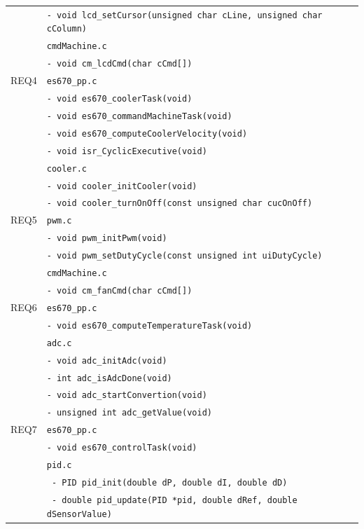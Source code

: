 \documentclass{article}
\begin{document}
\begin{table}[H]
\begin{tabular}{|c|l|}
						& \texttt{- void lcd\_setCursor(unsigned char cLine, unsigned char cColumn)}\\
						& \texttt{cmdMachine.c}\\ 
						& \texttt{- void cm\_lcdCmd(char cCmd[])}\\
   	    \hline REQ4    	& \texttt{es670\_pp.c}\\
       	           		& \texttt{- void es670\_coolerTask(void)}\\
     					& \texttt{- void es670\_commandMachineTask(void)}\\
						& \texttt{- void es670\_computeCoolerVelocity(void)}\\
						& \texttt{- void isr\_CyclicExecutive(void)}\\
						& \texttt{cooler.c}\\
						& \texttt{- void cooler\_initCooler(void)}\\
						& \texttt{- void cooler\_turnOnOff(const unsigned char cucOnOff)}\\
       	\hline REQ5     & \texttt{pwm.c}\\
						& \texttt{- void pwm\_initPwm(void)}\\
						& \texttt{- void pwm\_setDutyCycle(const unsigned int uiDutyCycle)}\\
						& \texttt{cmdMachine.c}\\
						& \texttt{- void cm\_fanCmd(char cCmd[])}\\
       	\hline REQ6    	& \texttt{es670\_pp.c}\\
						& \texttt{- void es670\_computeTemperatureTask(void)}\\
						& \texttt{adc.c}\\
						& \texttt{- void adc\_initAdc(void)}\\
						& \texttt{- int adc\_isAdcDone(void)}\\
						& \texttt{- void adc\_startConvertion(void)}\\
						& \texttt{- unsigned int adc\_getValue(void)}\\
		\hline REQ7		& \texttt{es670\_pp.c}\\
						& \texttt{- void es670\_controlTask(void)}\\
						& \texttt{pid.c}\\
						& \texttt{ - PID pid\_init(double dP, double dI, double dD)}\\
						& \texttt{ - double pid\_update(PID *pid, double dRef, double dSensorValue)}\\
		\hline
	\end{tabular} 
	\normalsize
\end{table}
\end{document}
